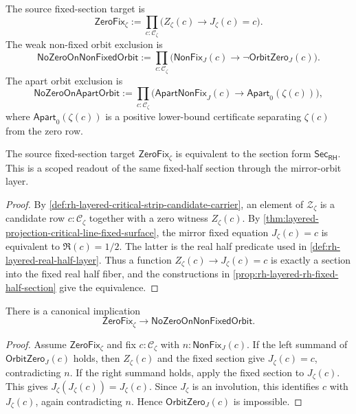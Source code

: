 \begin{definition}
\label{def:rh-layered-zero-fixed-section-orbit-exclusions}
The source fixed-section target is
$$
\mathsf{ZeroFix}_{\zeta}
:=
\prod_{c:\mathcal C_{\zeta}}
\bigl(Z_{\zeta}(c)\to J_{\zeta}(c)=c\bigr).
$$
The weak non-fixed orbit exclusion is
$$
\mathsf{NoZeroOnNonFixedOrbit}
:=
\prod_{c:\mathcal C_{\zeta}}
\bigl(
\mathsf{NonFix}_{J}(c)\to
\neg\mathsf{OrbitZero}_{J}(c)
\bigr).
$$
The apart orbit exclusion is
$$
\mathsf{NoZeroOnApartOrbit}
:=
\prod_{c:\mathcal C_{\zeta}}
\bigl(
\mathsf{ApartNonFix}_{J}(c)\to
\mathsf{Apart}_{0}(\zeta(c))
\bigr),
$$
where $\mathsf{Apart}_{0}(\zeta(c))$ is a positive lower-bound certificate
separating $\zeta(c)$ from the zero row.
\end{definition}

\begin{theorem}
\label{thm:rh-layered-source-fixed-section-target}
The source fixed-section target $\mathsf{ZeroFix}_{\zeta}$ is equivalent
to the section form $\mathsf{Sec}_{\mathsf{RH}}$. This is a scoped readout of
the same fixed-half section through the mirror-orbit layer.
\end{theorem}

\begin{proof}
By \autoref{def:rh-layered-critical-strip-candidate-carrier}, an element
of $\mathcal Z_{\zeta}$ is a candidate row $c:\mathcal C_{\zeta}$ together
with a zero witness $Z_{\zeta}(c)$. By
\autoref{thm:layered-projection-critical-line-fixed-surface}, the mirror
fixed equation $J_{\zeta}(c)=c$ is equivalent to
$\Re(c)=1/2$. The latter is the real half predicate used in
\autoref{def:rh-layered-real-half-layer}. Thus a function
$Z_{\zeta}(c)\to J_{\zeta}(c)=c$ is exactly a section into the fixed real
half fiber, and the constructions in
\autoref{prop:rh-layered-rh-fixed-half-section} give the equivalence.
\end{proof}

\begin{theorem}
\label{thm:rh-layered-fixed-section-excludes-nonfixed-orbit-zeros}
There is a canonical implication
$$
\mathsf{ZeroFix}_{\zeta}
\to
\mathsf{NoZeroOnNonFixedOrbit}.
$$
\end{theorem}

\begin{proof}
Assume $\mathsf{ZeroFix}_{\zeta}$ and fix
$c:\mathcal C_{\zeta}$ with $n:\mathsf{NonFix}_{J}(c)$. If the left
summand of $\mathsf{OrbitZero}_{J}(c)$ holds, then
$Z_{\zeta}(c)$ and the fixed section give $J_{\zeta}(c)=c$, contradicting
$n$. If the right summand holds, apply the fixed section to
$J_{\zeta}(c)$. This gives
$J_{\zeta}(J_{\zeta}(c))=J_{\zeta}(c)$. Since $J_{\zeta}$ is an
involution, this identifies $c$ with $J_{\zeta}(c)$, again contradicting
$n$. Hence $\mathsf{OrbitZero}_{J}(c)$ is impossible.
\end{proof}

